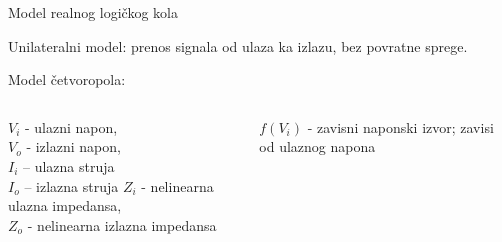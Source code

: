 \begin{frame}[label=08-s009]{Model realnog logičkog kola}

\alert{Unilateralni model}: prenos signala od ulaza ka izlazu, bez povratne sprege.\par\smallskip
Model četvoropola:\par\smallskip
\centering\par\medskip\raggedright
\begin{columns}[T,onlytextwidth]
$V_i$ - ulazni napon,\\$V_o$ - izlazni napon,\\$I_i$ – ulazna struja\\$I_o$ – izlazna struja
$Z_i$ - nelinearna ulazna impedansa,\\$Z_o$ - nelinearna izlazna impedansa\par
$f(V_i)$ - zavisni naponski izvor; zavisi od ulaznog napona
\end{columns}
\end{frame}
